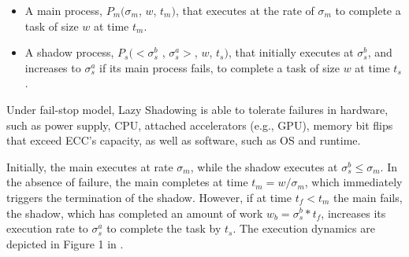 \begin{itemize}
	\item A main process, $P_m(\sigma_m$, $w$, $t_m)$, that executes at the rate of $\sigma_m$ to complete a task of size $w$ at time $t_m$.
	\item A shadow process, $P_s(<\sigma_s^b$ , $\sigma_s^a>$, $w$, $t_s)$, that initially executes at $\sigma_s^b$, and increases to $\sigma_s^a$ if its main process fails, to complete a task of size $w$ at time $t_s$.%
\end{itemize}

Under fail-stop model, Lazy Shadowing is able to tolerate failures in hardware, such as power supply, CPU, attached accelerators (e.g., GPU), memory bit flips that exceed ECC's capacity, as well as software, such as OS and runtime. 



Initially, the main executes at rate $\sigma_m$, while the shadow executes at $\sigma_s^b \le \sigma_m$. %
In the absence of failure, the main completes at time 
$t_m = w/\sigma_m$, which immediately triggers the termination of the
shadow. However, if at time $t_f < t_m$ the main fails, the shadow, which has completed an amount of work $w_b=\sigma_s^b * t_f$, increases its execution rate to $\sigma_s^a$ to complete the task by $t_s$. %
The execution dynamics are depicted in Figure 1 in \cite{cui_en7085151}. %

